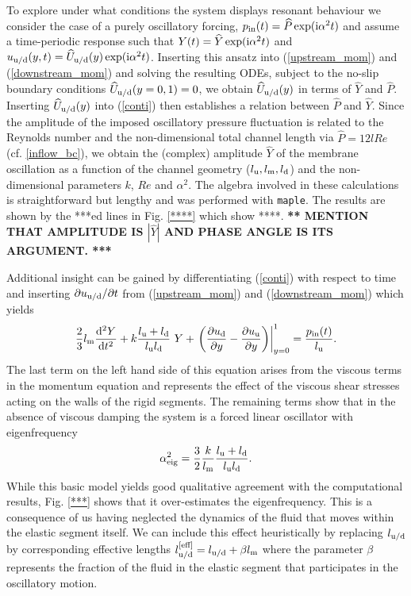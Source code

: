 \documentclass[aps,prl,reprint,superscriptaddress,floatfix]{revtex4-1}
\newcommand{\Rey}{\mathit{Re}}
\newcommand{\be}{\begin{equation}}
\newcommand{\ee}{\end{equation}}
\begin{document}
To explore under what conditions the system displays resonant
behaviour we consider the case of a purely oscillatory forcing, $p_{\rm in}(t) =
\widehat{P} \exp({\rm i}\alpha^2 t)$ and assume a time-periodic response such
that $Y(t) = \widehat{Y} \exp({\rm i}\alpha^2 t)$ and
$u_{\rm u/d}(y,t) = \widehat{U}_{\rm u/d}(y) \exp({\rm i}\alpha^2
t)$. Inserting this ansatz into (\ref{upstream_mom}) and
(\ref{downstream_mom}) and solving the resulting ODEs, subject to
the no-slip boundary conditions $\widehat{U}_{\rm u/d}(y=0,1)=0$,
we obtain $\widehat{U}_{\rm u/d}(y)$ in terms
of $\widehat{Y}$ and $\widehat{P}$.
Inserting $\widehat{U}_{\rm u/d}(y)$ into (\ref{conti}) then
establishes a relation between $\widehat{P}$ and $\widehat{Y}$. Since the
amplitude of the imposed oscillatory pressure fluctuation is related
to the Reynolds number and the non-dimensional total channel length
via $\widehat{P} = 12 l \Rey$ (cf. \ref{inflow_bc}), we obtain
the (complex) amplitude $\widehat{Y}$ of the membrane oscillation
as a function of the channel geometry ($l_{\rm u}, l_{\rm m}, l_{\rm
  d}$) and the non-dimensional parameters $k$, $Re$ and $\alpha^2$.
The algebra involved in these calculations is straightforward but
lengthy and was performed with {\tt maple}. The results are
shown by the ***ed lines in Fig. \ref{****} which show ****.
{\bf *** MENTION THAT AMPLITUDE IS $|\widehat{Y}|$ AND PHASE
  ANGLE IS ITS ARGUMENT. ***}

 Additional insight can be gained by differentiating (\ref{conti})
with respect to time and inserting $\partial u_{\rm u/d}/\partial t$
from (\ref{upstream_mom}) and (\ref{downstream_mom}) which yields
\be
\frac{2}{3}l_{\rm m} \frac{{\rm d}^2 Y}{{\rm d}t^2} +
k \frac{l_{\rm u} + l_{\rm d}}{l_{\rm u} l_{\rm d}} \ Y
+ \left.
\left( \frac{\partial u_{\rm d}}{\partial y} -
       \frac{\partial u_{\rm u}}{\partial y} \right)
\right|_{y=0}^1 = \frac{p_{\rm in}(t)}{l_{\rm u}}.
\ee
The last term on the left hand side of this equation arises from the
viscous terms in the momentum equation and represents the effect of
the viscous shear stresses acting on the walls of the rigid segments.
The remaining terms show that in the absence of viscous damping
the system is a forced linear oscillator with eigenfrequency
\be
\alpha_{\rm eig}^2 = \frac{3}{2} \frac{k}{l_{\rm m}}
\frac{l_{\rm u} + l_{\rm d}}{l_{\rm u} l_{\rm d}}.
\ee
While this basic model yields good qualitative agreement
with the computational results, Fig. \ref{***} shows that
it over-estimates the eigenfrequency. This is a consequence of us
having neglected the dynamics of the fluid that moves within the
elastic segment itself. We can include this effect heuristically by replacing
$l_{\rm u/d}$ by corresponding effective lengths $l_{\rm u/d}^{\rm [eff]} =
l_{\rm u/d} + \beta l_{\rm m}$ where the parameter $\beta$
represents the fraction of the fluid in the elastic
segment that participates in the oscillatory motion.
\end{document}
